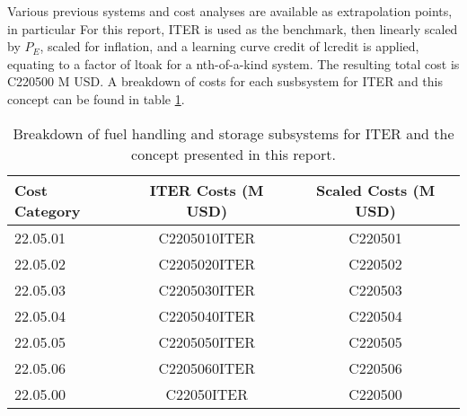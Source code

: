 Various previous systems and cost analyses are available as extrapolation points, in particular For this report, ITER is used as the benchmark, then linearly scaled by $P_E$, scaled for inflation, and a learning curve credit of lcredit is applied, equating to a factor of ltoak for a nth-of-a-kind system.  The resulting total cost is C220500 M USD. A breakdown of costs for each susbsystem for ITER and this concept can be found in table \ref{tab:fuel}.



\begin{table}
    \centering
    \begin{tabular}{lcc}
    \hline
        Cost Category & ITER Costs (M USD) & Scaled Costs (M USD)\\
        \hline
       22.05.01  & C2205010ITER & C220501\\
       22.05.02  & C2205020ITER & C220502\\
       22.05.03  & C2205030ITER & C220503\\
       22.05.04  & C2205040ITER & C220504\\
       22.05.05  & C2205050ITER & C220505\\
       22.05.06  & C2205060ITER & C220506\\
       22.05.00  & C22050ITER   & C220500\\
       \hline
    \end{tabular}
    \caption{Breakdown of fuel handling and storage subsystems for ITER and the concept presented in this report.}
    \label{tab:fuel}
\end{table}
